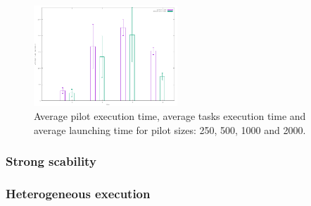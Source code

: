 \begin{figure}[!htb]
        \includegraphics[width=0.48\textwidth]{./figures/draft/AvgT.pdf}
    \caption{Average pilot execution time, average tasks execution time and average launching time for pilot sizes: 250, 500, 1000 and 2000.}
\label{fig:weakScal2}
\end{figure}

\subsubsection{Strong scability}

\subsubsection{Heterogeneous execution}






%
%
